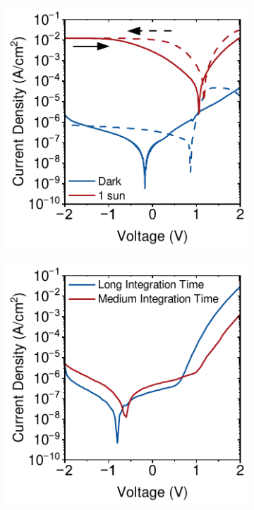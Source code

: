 \begin{figure}[htbp]
    \centering

    \begin{subfigure}[b]{0.4\textwidth}
        \centering
        \includegraphics[width=\textwidth]{chapters/material_properties/images/Forward-Reverse-Plot.pdf}
        \caption{}
        \label{fig:ch2:scan_direction}
    \end{subfigure}
    \hfill
    \begin{subfigure}[b]{0.4\textwidth}
        \centering
        \includegraphics[width=\textwidth]{chapters/material_properties/images/Integration-Speed.pdf}
        \caption{}
        \label{fig:ch2:scan_speed}
    \end{subfigure}


\end{figure}
